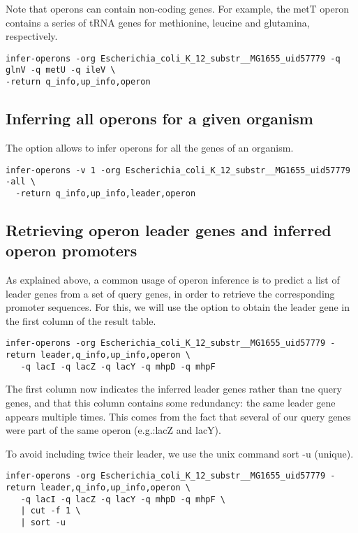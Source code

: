 Note that operons can contain non-coding genes. For example, the
metT operon contains a series of tRNA genes for methionine, leucine
and glutamina, respectively.

\begin{lstlisting}
infer-operons -org Escherichia_coli_K_12_substr__MG1655_uid57779 -q glnV -q metU -q ileV \
-return q_info,up_info,operon
\end{lstlisting}

\subsection{Inferring all operons for a given organism}

The option  allows to infer operons for all the genes of
an organism.

\begin{lstlisting}
infer-operons -v 1 -org Escherichia_coli_K_12_substr__MG1655_uid57779 -all \
  -return q_info,up_info,leader,operon
\end{lstlisting}

\subsection{Retrieving operon leader genes and inferred
  operon promoters}

As explained above, a common usage of operon inference is to predict a
list of leader genes from a set of query genes, in order to retrieve
the corresponding promoter sequences. For this, we will use the option
\option{-return} to obtain the leader gene in the first column of the
result table. 

\begin{lstlisting}
infer-operons -org Escherichia_coli_K_12_substr__MG1655_uid57779 -return leader,q_info,up_info,operon \
   -q lacI -q lacZ -q lacY -q mhpD -q mhpF
\end{lstlisting}

The first column now indicates the inferred leader genes rather than
tne query genes, and that this column contains some redundancy: the
same leader gene appears multiple times. This comes from the fact that
several of our query genes were part of the same operon (e.g.:lacZ and
lacY).

To avoid including twice their leader, we use the unix command sort -u
(unique).


\begin{lstlisting}
infer-operons -org Escherichia_coli_K_12_substr__MG1655_uid57779 -return leader,q_info,up_info,operon \
   -q lacI -q lacZ -q lacY -q mhpD -q mhpF \
   | cut -f 1 \
   | sort -u 
\end{lstlisting}


